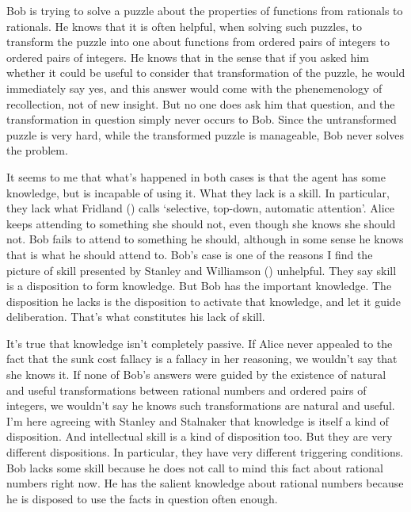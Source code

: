 \documentclass[
  10pt,
  letterpaper,
  DIV=11,
  numbers=noendperiod,
  twoside]{scrartcl}
\begin{document}
Bob is trying to solve a puzzle about the properties of functions from
rationals to rationals. He knows that it is often helpful, when solving
such puzzles, to transform the puzzle into one about functions from
ordered pairs of integers to ordered pairs of integers. He knows that in
the sense that if you asked him whether it could be useful to consider
that transformation of the puzzle, he would immediately say yes, and
this answer would come with the phenemenology of recollection, not of
new insight. But no one does ask him that question, and the
transformation in question simply never occurs to Bob. Since the
untransformed puzzle is very hard, while the transformed puzzle is
manageable, Bob never solves the problem.

It seems to me that what's happened in both cases is that the agent has
some knowledge, but is incapable of using it. What they lack is a skill.
In particular, they lack what Fridland
() calls `selective, top-down,
automatic attention'. Alice keeps attending to something she should not,
even though she knows she should not. Bob fails to attend to something
he should, although in some sense he knows that is what he should attend
to. Bob's case is one of the reasons I find the picture of skill
presented by Stanley and Williamson
() unhelpful. They say skill
is a disposition to form knowledge. But Bob has the important knowledge.
The disposition he lacks is the disposition to activate that knowledge,
and let it guide deliberation. That's what constitutes his lack of
skill.

It's true that knowledge isn't completely passive. If Alice never
appealed to the fact that the sunk cost fallacy is a fallacy in her
reasoning, we wouldn't say that she knows it. If none of Bob's answers
were guided by the existence of natural and useful transformations
between rational numbers and ordered pairs of integers, we wouldn't say
he knows such transformations are natural and useful. I'm here agreeing
with Stanley and Stalnaker that knowledge is itself a kind of
disposition. And intellectual skill is a kind of disposition too. But
they are very different dispositions. In particular, they have very
different triggering conditions. Bob lacks some skill because he does
not call to mind this fact about rational numbers right now. He has the
salient knowledge about rational numbers because he is disposed to use
the facts in question often enough.
\end{document}
